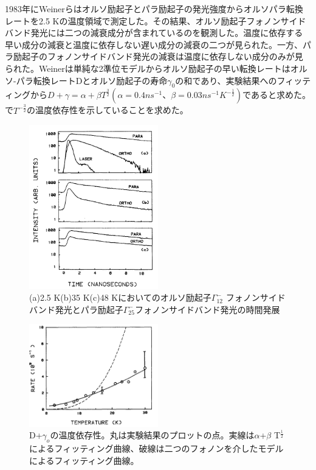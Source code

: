 1983年にWeinerらはオルソ励起子とパラ励起子の発光強度からオルソパラ転換レートを2.5 Kの温度領域で測定した。その結果、オルソ励起子フォノンサイドバンド発光には二つの減衰成分が含まれているのを観測した。温度に依存する早い成分の減衰と温度に依存しない遅い成分の減衰の二つが見られた。一方、パラ励起子のフォノンサイドバンド発光の減衰は温度に依存しない成分のみが見られた。Weinerは単純な2準位モデルからオルソ励起子の早い転換レートはオルソ-パラ転換レートDとオルソ励起子の寿命$\gamma_0$の和であり、実験結果へのフィッティングから$D+\gamma = \alpha + \beta T^\frac{3}{2}(\alpha = 0.4ns^{-1}、\beta = 0.03 ns^{-1}K^{-\frac{1}{2}})$であると求めた。
\cite{Weiner1983}で$T^{-\frac{3}{2}}$の温度依存性を示していることを求めた。
\begin{figure}[htbp]
\centering
\includegraphics[width=0.5\textwidth]{Screenshoot_2024-08-16_22.40.09.png}
\caption{(a)2.5 K(b)35 K(c)48 Kにおいてのオルソ励起子$\Gamma^{-}_{12}$ フォノンサイドバンド発光とパラ励起子$\Gamma^{-}_{25}$フォノンサイドバンド発光の時間発展}
\label{fig:exciton_phonon_sideband2}
\end{figure}
\begin{figure}[htbp]
\centering
\includegraphics[width=0.5\textwidth]{Screenshoot_2024-08-16_23.06.06.png}
\caption{D+$\gamma_o$の温度依存性。丸は実験結果のプロットの点。実線は$\alpha$+$\beta$ T$^\frac{1}{2}$によるフィッティング曲線、破線は二つのフォノンを介したモデルによるフィッティング曲線。}
\label{fig:exciton_phonon_sideband2}
\end{figure}

